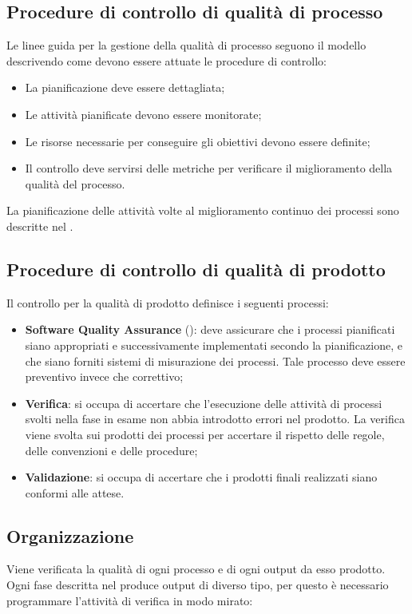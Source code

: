 	\subsection{Procedure di controllo di qualità di processo}
	Le linee guida per la gestione della qualità di processo seguono il modello  descrivendo come devono essere attuate le procedure di controllo:

		\begin{itemize}
			\item La pianificazione deve essere dettagliata;
			\item Le attività pianificate devono essere monitorate;
			\item Le risorse necessarie per conseguire gli obiettivi devono essere definite;
			\item Il controllo deve servirsi delle metriche per verificare il miglioramento della qualità del processo.
		\end{itemize}

	La pianificazione delle attività volte al miglioramento continuo dei processi sono descritte nel \PianoDiProgetto.

	\subsection{Procedure di controllo di qualità di prodotto}
	Il controllo per la qualità di prodotto definisce i seguenti processi:

		\begin{itemize}
			\item \textbf{Software Quality Assurance} (): deve assicurare che i processi pianificati siano appropriati e successivamente implementati secondo la pianificazione, e che siano forniti sistemi di misurazione dei processi. Tale processo deve essere preventivo invece che correttivo;
			\item \textbf{Verifica}: si occupa di accertare che l’esecuzione delle attività di processi svolti nella fase in esame non abbia introdotto errori nel prodotto. La verifica viene svolta sui prodotti dei processi per accertare il rispetto delle regole, delle convenzioni e delle procedure;
			\item \textbf{Validazione}: si occupa di accertare che i prodotti finali realizzati siano conformi alle attese.
		\end{itemize}

	
	\subsection{Organizzazione}
	Viene verificata la qualità di ogni processo e di ogni output da esso prodotto. Ogni fase  descritta nel \PianoDiProgetto{} produce output di diverso tipo, per questo è necessario programmare l'attività di verifica in modo mirato:

